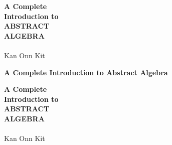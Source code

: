 {\begin{titlepage}
        \vspace*{\fill}
        \vspace{0.4cm}  %

        \begin{center}
            \color{white}

            {\fontsize{18pt}{0pt}\selectfont \textbf{A Complete}\\\textbf{Introduction to}}\\

            \vspace{0.4cm}
            {\fontsize{44pt}{0pt}\selectfont \textbf{ABSTRACT}}\\
            \vspace{0.15cm}
            {\fontsize{44pt}{0pt}\selectfont \textbf{ALGEBRA}}\\

            \vspace{0.5cm}
            {\fontsize{14pt}{0pt}\selectfont \editiontext}\\

            \vspace{1.25cm}
            {\fontsize{20pt}{0pt}\selectfont Kan Onn Kit}\\
        \end{center}
        \vspace*{\fill}
    \end{titlepage}
}{
    \thispagestyle{empty}
    \null\vspace{4cm}
    \begin{raggedleft}
        {\fontsize{24pt}{0pt}\selectfont \textbf{A Complete Introduction to Abstract Algebra}}\\
    \end{raggedleft}

    \begin{titlepage}
        \null\vspace{4cm}
        \begin{raggedleft}
            {\fontsize{20pt}{0pt}\selectfont \textbf{A Complete}\\\textbf{Introduction to}}\\

            \vspace{0.4cm}
            {\fontsize{48pt}{0pt}\selectfont \textbf{ABSTRACT}}\\
            \vspace{0.15cm}
            {\fontsize{48pt}{0pt}\selectfont \textbf{ALGEBRA}}\\

            \vspace{0.5cm}
            {\fontsize{16pt}{0pt}\selectfont \editiontext}\\

            \vspace{1.25cm}
            {\fontsize{20pt}{0pt}\selectfont Kan Onn Kit}\\
        \end{raggedleft}
        \vspace*{\fill}
    \end{titlepage}
}

